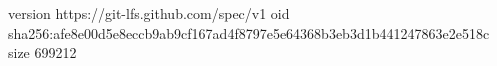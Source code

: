 version https://git-lfs.github.com/spec/v1
oid sha256:afe8e00d5e8eccb9ab9cf167ad4f8797e5e64368b3eb3d1b441247863e2e518c
size 699212
